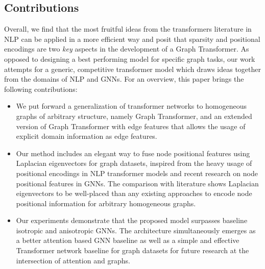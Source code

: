 \documentclass[letterpaper]{article} %
\begin{document}
\subsection{Contributions}
Overall, we find that the most fruitful ideas from the transformers literature in NLP can be applied in a more efficient way and posit that sparsity and positional encodings are two \textit{key} aspects in the development of a Graph Transformer.
As opposed to designing a best performing model for specific graph tasks, our work attempts for a generic, competitive transformer model which draws ideas together from the domains of NLP and GNNs.
For an overview, this paper brings the following contributions:
\begin{itemize}
    \item We put forward a generalization of transformer networks to homogeneous graphs of arbitrary structure, namely Graph Transformer, and an extended version of Graph Transformer with edge features that allows the usage of explicit domain information as edge features.
    \item Our method includes an elegant way to fuse node positional features using Laplacian eigenvectors for graph datasets, inspired from the heavy usage of positional encodings in NLP transformer models and recent research on node positional features in GNNs.
    The comparison with literature shows Laplacian eigenvectors to be well-placed than any existing approaches to encode node positional information for arbitrary homogeneous graphs.
    \item Our experiments demonstrate that the proposed model surpasses baseline isotropic and anisotropic GNNs. The architecture simultaneously emerges as a better attention based GNN baseline as well as a simple and effective Transformer network baseline for graph datasets for future research at the intersection of attention and graphs.
\end{itemize}





\end{document}
